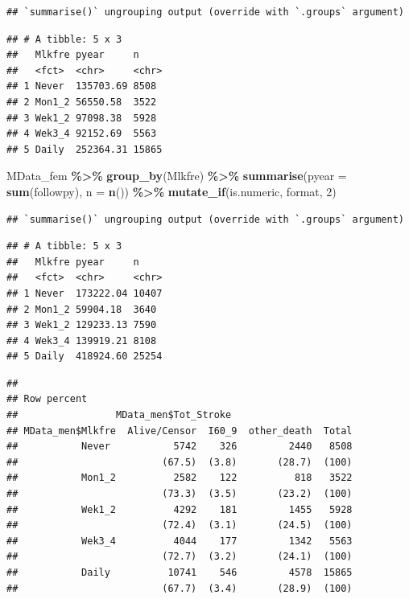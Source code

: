 \documentclass[
]{article}
\newenvironment{Shaded}{\begin{snugshade}}{\end{snugshade}}
\newcommand{\DataTypeTok}[1]{\textcolor[rgb]{0.13,0.29,0.53}{#1}}
\newcommand{\DecValTok}[1]{\textcolor[rgb]{0.00,0.00,0.81}{#1}}
\newcommand{\KeywordTok}[1]{\textcolor[rgb]{0.13,0.29,0.53}{\textbf{#1}}}
\newcommand{\NormalTok}[1]{#1}
\newcommand{\OperatorTok}[1]{\textcolor[rgb]{0.81,0.36,0.00}{\textbf{#1}}}
\newcommand{\OtherTok}[1]{\textcolor[rgb]{0.56,0.35,0.01}{#1}}
\newcommand{\StringTok}[1]{\textcolor[rgb]{0.31,0.60,0.02}{#1}}
\begin{document}
\begin{verbatim}
## `summarise()` ungrouping output (override with `.groups` argument)
\end{verbatim}

\begin{verbatim}
## # A tibble: 5 x 3
##   Mlkfre pyear     n    
##   <fct>  <chr>     <chr>
## 1 Never  135703.69 8508 
## 2 Mon1_2 56550.58  3522 
## 3 Wek1_2 97098.38  5928 
## 4 Wek3_4 92152.69  5563 
## 5 Daily  252364.31 15865
\end{verbatim}

\begin{Shaded}
\begin{Highlighting}[]
\NormalTok{MData\_fem }\OperatorTok{\%\textgreater{}\%}
\StringTok{  }\KeywordTok{group\_by}\NormalTok{(Mlkfre) }\OperatorTok{\%\textgreater{}\%}
\StringTok{  }\KeywordTok{summarise}\NormalTok{(}\DataTypeTok{pyear =} \KeywordTok{sum}\NormalTok{(followpy), }\DataTypeTok{n =} \KeywordTok{n}\NormalTok{()) }\OperatorTok{\%\textgreater{}\%}\StringTok{ }
\StringTok{  }\KeywordTok{mutate\_if}\NormalTok{(is.numeric, format, }\DecValTok{2}\NormalTok{)}
\end{Highlighting}
\end{Shaded}

\begin{verbatim}
## `summarise()` ungrouping output (override with `.groups` argument)
\end{verbatim}

\begin{verbatim}
## # A tibble: 5 x 3
##   Mlkfre pyear     n    
##   <fct>  <chr>     <chr>
## 1 Never  173222.04 10407
## 2 Mon1_2 59904.18  3640 
## 3 Wek1_2 129233.13 7590 
## 4 Wek3_4 139919.21 8108 
## 5 Daily  418924.60 25254
\end{verbatim}

\begin{Shaded}
\end{Shaded}

\begin{verbatim}
## 
## Row percent 
##                 MData_men$Tot_Stroke
## MData_men$Mlkfre  Alive/Censor  I60_9  other_death  Total
##           Never           5742    326         2440   8508
##                         (67.5)  (3.8)       (28.7)  (100)
##           Mon1_2          2582    122          818   3522
##                         (73.3)  (3.5)       (23.2)  (100)
##           Wek1_2          4292    181         1455   5928
##                         (72.4)  (3.1)       (24.5)  (100)
##           Wek3_4          4044    177         1342   5563
##                         (72.7)  (3.2)       (24.1)  (100)
##           Daily          10741    546         4578  15865
##                         (67.7)  (3.4)       (28.9)  (100)
\end{verbatim}
\end{document}
